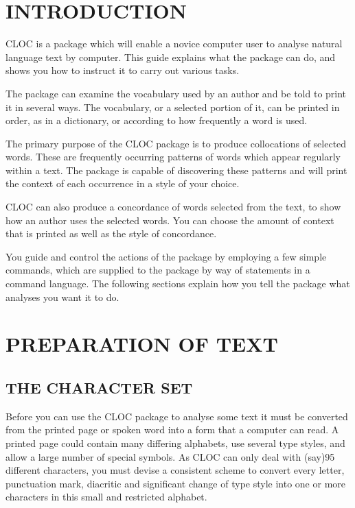 \tableofcontents
\newpage

\section{INTRODUCTION}
CLOC is a package which will enable a novice computer user to
analyse natural language text by computer.  This guide explains
what the package can do, and shows you how to instruct
it to carry out various tasks.

The package can examine the vocabulary used by an author and be
told to print it in several ways.  The vocabulary, or a selected
portion of it, can be printed in order, as in a dictionary, or
according to how frequently a word is used.

The primary purpose of the CLOC package is to produce collocations
of selected words.  These are frequently occurring patterns of
words which appear regularly within a text.  The package is capable
of discovering these patterns and will print the context of each
occurrence in a style of your choice.

CLOC can also produce a concordance of words selected from the
text, to show how an author uses the selected words. You can choose
the amount of context that is printed as well as the style of concordance.

You guide and control the actions of the package by employing
a few simple commands, which are supplied to the package by way of
statements in a command language.  The following sections explain
how you tell the package what analyses you want it to do.

\section{PREPARATION OF TEXT}
\subsection{THE CHARACTER SET}
Before you can use the CLOC package to analyse some text it must be
converted from the printed page or spoken word into a form that a computer
can read.
A printed page
could contain many differing alphabets, use several type styles,
and allow a large number of special symbols.  As CLOC can only deal
with (say)95 different characters, you must devise a consistent scheme to
convert every letter, punctuation mark, diacritic and significant
change of type style into one or more characters in this small
and restricted alphabet.

